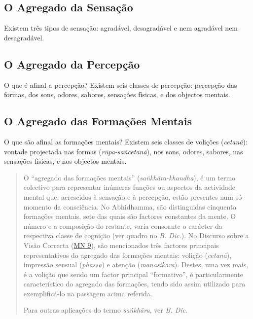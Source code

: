 
\subsection{O Agregado da Sensação}


Existem três tipos de sensação: agradável, desagradável e nem agradável nem
desagradável.


\subsection{O Agregado da Percepção}


O que é afinal a percepção? Existem seis classes de percepção: percepção das
formas, dos sons, odores, sabores, sensações físicas, e dos objectos mentais.

\subsection{O Agregado das Formações Mentais}


O que são afinal as formações mentais? Existem seis classes de volições
(\emph{cetanā}): vontade projectada nas formas (\emph{rūpa-sañcetanā}), nos
sons, odores, sabores, nas sensações físicas, e nos objectos mentais.


\begin{quote}
  O ``agregado das formações mentais'' (\emph{sa\.{n}khāra-khandha}), é um termo
  colectivo para representar inúmeras funções ou aspectos da actividade mental
  que, acrescidos à sensação e à percepção, estão presentes num só momento da
  consciência. No Abhidhamma, são distinguidas cinquenta formações mentais, sete
  das quais são factores constantes da mente. O número e a composição do
  restante, varia consoante o carácter da respectiva classe de cognição (ver
  quadro no \emph{B. Dic.}). No Discurso sobre a Visão Correcta (\href{https://suttacentral.net/mn9/en/bodhi}{MN 9}),
  são mencionados três factores principais representativos do agregado das
  formações mentais: volição (\emph{cetanā}), impressão sensual (\emph{phassa})
  e atenção (\emph{manasikāra}). Destes, uma vez mais, é a volição que sendo um
  factor principal ``formativo'', é particularmente característico do agregado
  das formações, tendo sido assim utilizado para exemplificá-lo na passagem
  acima referida.

  Para outras aplicações do termo \emph{sa\.{n}khāra}, ver \emph{B. Dic.}
\end{quote}

